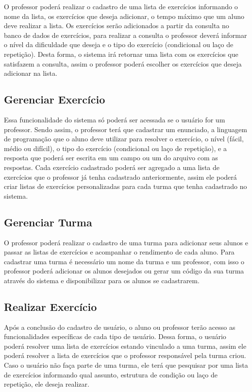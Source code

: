 O professor poderá realizar o cadastro de uma lista de exercícios informando o nome da lista, os exercícios que deseja adicionar, o tempo máximo que um aluno deve realizar a lista. Os exercícios serão adicionados a partir da consulta no banco de dados de exercícios, para realizar a consulta o professor deverá informar o nível da dificuldade que deseja e o tipo do exercício (condicional ou laço de repetição). Desta forma, o sistema irá retornar uma lista com os exercícios que satisfazem a consulta, assim o professor poderá escolher os exercícios que deseja adicionar na lista.

\subsection{Gerenciar Exercício}

Essa funcionalidade do sistema só poderá ser acessada se o usuário for um professor. Sendo assim, o professor terá que cadastrar um enunciado, a linguagem de programação que o aluno deve utilizar para resolver o exercício, o nível (fácil, médio ou difícil), o tipo do exercício (condicional ou laço de repetição), e a resposta que poderá ser escrita em um campo ou um  do arquivo com as respostas. Cada exercício cadastrado poderá ser agregado a uma lista de exercícios que o professor já tenha cadastrado anteriormente, assim ele poderá criar listas de exercícios personalizadas para cada turma que tenha cadastrado no sistema.


\subsection{Gerenciar Turma}

O professor poderá realizar o cadastro de uma turma para adicionar seus alunos e passar as listas de exercícios e acompanhar o rendimento de cada aluno. Para cadastrar uma turma é necessário um nome da turma e um professor, com isso o professor poderá adicionar os alunos desejados ou gerar um código da sua turma através do sistema e disponibilizar para os alunos se cadastrarem.

\subsection{Realizar Exercício}

Após a conclusão do cadastro de usuário, o aluno ou professor terão acesso as funcionalidades específicas de cada tipo de usuário. Dessa forma, o usuário poderá resolver uma lista de exercícios estando vinculado a uma turma, assim ele poderá resolver a lista de exercícios que o professor responsável pela turma criou. Caso o usuário não faça parte de uma turma, ele terá que pesquisar por uma lista de exercícios informando qual assunto, estrutura de condição ou laço de repetição, ele deseja realizar.

